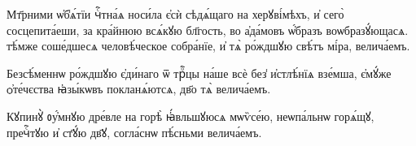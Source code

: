 \hKv Мт҃рними ѡ҆б̾ѧ́тїи чⷭ҇тна́ѧ носи́ла є҆сѝ сѣдѧ́щаго на  херꙋві́мѣхъ, и҆ сего̀ сосцепита́еши, за кра́йнюю всѧ́кꙋю  бл҃гость, во а҆да́мовъ ѡ҆́бразъ воѡбразꙋ́ющасѧ. тѣ́мже  соше́дшесѧ человѣ́ческое собра́нїе, и҆ тѧ̀ ро́ждшꙋю свѣ́тъ  мі́ра, велича́емъ. 

\hKv Безсѣ́меннѡ ро́ждшꙋю є҆ди́наго ѿ трⷪ҇цы на́ше всѐ без̾  и҆стлѣ́нїѧ взе́мша, є҆мꙋ́же   ѻ҆те́чєства ꙗ҆зы́кѡвъ покланѧ́ютсѧ, дв҃о тѧ̀ велича́емъ. 

\hKv Кꙋпинꙋ̀ ᲂу҆́мнꙋю дре́вле на горѣ̀ ꙗ҆́вльшꙋюсѧ мѡѷсе́ю,  неѡпа́льнѡ горѧ́щꙋ, пречⷭ҇тꙋю и҆ ст҃ꙋ́ю дв҃ꙋ, согла́снѡ  пѣ́сньми велича́емъ.  

